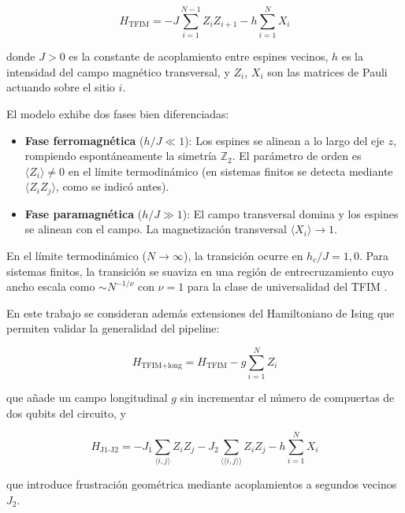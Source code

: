 \documentclass[11pt,a4paper,spanish]{book}
\begin{document}
\begin{equation}
H_{\text{TFIM}} = -J \sum_{i=1}^{N-1} Z_i Z_{i+1} - h \sum_{i=1}^{N} X_i
\label{eq:tfim}
\end{equation}

\noindent donde $J > 0$ es la constante de acoplamiento entre espines vecinos, $h$ es la intensidad del campo magnético transversal, y $Z_i$, $X_i$ son las matrices de Pauli actuando sobre el sitio $i$.

El modelo exhibe dos fases bien diferenciadas:

\begin{itemize}
    \item \textbf{Fase ferromagnética} ($h/J \ll 1$): Los espines se alinean a lo largo del eje $z$, rompiendo espontáneamente la simetría $\mathbb{Z}_2$. El parámetro de orden es $\langle Z_i \rangle \neq 0$ en el límite termodinámico (en sistemas finitos se detecta mediante $\langle Z_i Z_j \rangle$, como se indicó antes).
    \item \textbf{Fase paramagnética} ($h/J \gg 1$): El campo transversal domina y los espines se alinean con el campo. La magnetización transversal $\langle X_i \rangle \to 1$.
\end{itemize}

En el límite termodinámico ($N \to \infty$), la transición ocurre en $h_c/J = 1{,}0$. Para sistemas finitos, la transición se suaviza en una región de entrecruzamiento cuyo ancho escala como $\sim N^{-1/\nu}$ con $\nu = 1$ para la clase de universalidad del TFIM \citep{dutta2015, sachdev2011}.

En este trabajo se consideran además extensiones del Hamiltoniano de Ising que permiten validar la generalidad del pipeline:

\begin{equation}
H_{\text{TFIM+long}} = H_{\text{TFIM}} - g \sum_{i=1}^{N} Z_i
\label{eq:tfim_long}
\end{equation}

\noindent que añade un campo longitudinal $g$ sin incrementar el número de compuertas de dos qubits del circuito, y

\begin{equation}
H_{\text{J1-J2}} = -J_1 \sum_{\langle i,j \rangle} Z_i Z_j - J_2 \sum_{\langle\langle i,j \rangle\rangle} Z_i Z_j - h \sum_{i=1}^{N} X_i
\label{eq:tfim_frustrated}
\end{equation}

\noindent que introduce frustración geométrica mediante acoplamientos a segundos vecinos $J_2$.
\end{document}
